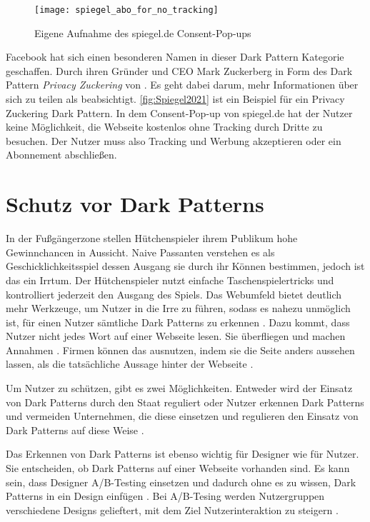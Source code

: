 \documentclass[conference,compsoc,final,a4paper]{IEEEtran}
\begin{document}
\begin{figure}[!ht]
  \centering
  \texttt{[image: spiegel\_abo\_for\_no\_tracking]}
  \caption{Eigene Aufnahme des spiegel.de Consent-Pop-ups~\autocite{Spiegel2021}}
  \label{fig:Spiegel2021}
\end{figure}

Facebook hat sich einen besonderen Namen in dieser Dark Pattern Kategorie geschaffen. Durch ihren Gründer und CEO Mark Zuckerberg in Form des Dark Pattern \textit{Privacy Zuckering} von \citeauthor{Brignull} \autocite{Brignull}. Es geht dabei darum, mehr Informationen über sich zu teilen als beabsichtigt. \autoref{fig:Spiegel2021} ist ein Beispiel für ein Privacy Zuckering Dark Pattern. In dem Consent-Pop-up von spiegel.de hat der Nutzer keine Möglichkeit, die Webseite kostenlos ohne Tracking durch Dritte zu besuchen. Der Nutzer muss also Tracking und Werbung akzeptieren oder ein Abonnement abschließen. 


\section{Schutz vor Dark Patterns}
In der Fußgängerzone stellen Hütchenspieler ihrem Publikum hohe Gewinnchancen in Aussicht. Naive Passanten verstehen es als Geschicklichkeitsspiel dessen Ausgang sie durch ihr Können bestimmen, jedoch ist das ein Irrtum. Der Hütchenspieler nutzt einfache Taschenspielertricks und kontrolliert jederzeit den Ausgang des Spiels. Das Webumfeld bietet deutlich mehr Werkzeuge, um Nutzer in die Irre zu führen, sodass es nahezu unmöglich ist, für einen Nutzer sämtliche Dark Patterns zu erkennen \autocite{M.Bhoot2020}. Dazu kommt, dass Nutzer nicht jedes Wort auf einer Webseite lesen. Sie überfliegen und machen Annahmen \autocite{Brignull}. Firmen können das ausnutzen, indem sie die Seite anders aussehen lassen, als die tatsächliche Aussage hinter der Webseite \autocite{Brignull}.

Um Nutzer zu schützen, gibt es zwei Möglichkeiten. Entweder wird der Einsatz von Dark Patterns durch den Staat reguliert oder Nutzer erkennen Dark Patterns und vermeiden Unternehmen, die diese einsetzen und regulieren den Einsatz von Dark Patterns auf diese Weise \autocite{Narayanan2020}.

Das Erkennen von Dark Patterns ist ebenso wichtig für Designer wie für Nutzer. Sie entscheiden, ob Dark Patterns auf einer Webseite vorhanden sind. Es kann sein, dass Designer A/B-Testing einsetzen und dadurch ohne es zu wissen, Dark Patterns in ein Design einfügen \autocite{Narayanan2020}. Bei A/B-Tesing werden Nutzergruppen verschiedene Designs gelieftert, mit dem Ziel Nutzerinteraktion zu steigern \autocite{Kohavi2017}.
\end{document}
